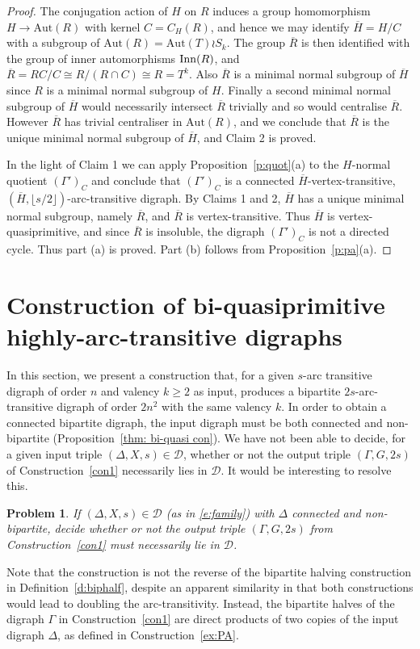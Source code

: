 \documentclass[11pt]{amsart}
\newtheorem{problem}{Problem}
\newcommand{\Aut}{\mathrm{Aut}}
\begin{document}
\begin{proof}
The conjugation action of $H$ on $R$ induces a group homomorphism $H\to \Aut(R)$ with kernel $C = C_H(R)$, and hence we may identify $\overline{H}=H/C$ with a subgroup of $\Aut(R)=\Aut(T)\wr S_k$. The group $\overline{R}$ is then identified with the group of inner automorphisms ${\rm Inn}(R)$, and $\overline{R} = RC/C\cong R/(R\cap C)\cong R= T^k$. Also $\overline{R}$ is a minimal normal subgroup of $\overline{H}$ since $R$ is a minimal normal subgroup of $H$. Finally a second minimal normal subgroup of $\overline{H}$ would necessarily intersect $\overline{R}$ trivially and so would centralise $\overline{R}$. However $\overline{R}$ has trivial centraliser in $\Aut(R)$, and we conclude that $\overline{R}$ is the unique minimal normal subgroup of $\overline{H}$, and Claim 2 is proved.
   
\smallskip
In the light of Claim 1 we can apply Proposition~\ref{p:quot}(a) to the $H$-normal quotient $(\Gamma')_{C}$ and conclude that $(\Gamma')_{C}$ is a connected $\overline{H}$-vertex-transitive, $(\overline{H},\lfloor s/2\rfloor)$-arc-transitive digraph. By Claims 1 and 2, $\overline{H}$ has a unique minimal normal subgroup, namely $\overline{R}$, and $\overline{R}$ is vertex-transitive. Thus  $\overline{H}$ is vertex-quasiprimitive, and since $\overline{R}$ is insoluble, the digraph  $(\Gamma')_{C}$ is not a directed cycle. Thus part (a) is proved. 
Part (b) follows from Proposition~\ref{p:pa}(a).
  \end{proof}


\section{Construction of bi-quasiprimitive highly-arc-transitive digraphs}\label{s:conn}

In this section, we present a construction that, for a given  $s$-arc transitive digraph of order $n$ and valency $k\geq 2$ as input, produces a bipartite $2s$-arc-transitive digraph of order $2n^2$ with the same valency $k$. In order to obtain a connected bipartite digraph, the input digraph must be both connected and non-bipartite (Proposition~\ref{thm: bi-quasi con}). We have not been able to decide, for a given input triple $(\Delta, X, s)\in\mathcal{D}$, whether or not the output  triple $(\Gamma, G, 2s)$ of Construction~\ref{con1} necessarily lies in $\mathcal{D}$. It would be interesting to resolve this. 

\begin{problem}\label{p6}
    If $(\Delta, X, s)\in\mathcal{D}$ (as in \eqref{e:family}) with $\Delta$ connected and non-bipartite, decide whether or not the output triple $(\Gamma, G, 2s)$ from Construction~\ref{con1} must necessarily lie in $\mathcal{D}$.  
\end{problem}
Note that the construction is not the reverse of the bipartite halving construction in Definition~\ref{d:biphalf}, despite an apparent similarity in that both constructions would lead to doubling the arc-transitivity. Instead, the bipartite halves of the digraph $\Gamma$ in Construction~\ref{con1} are direct products of two copies of the input digraph $\Delta$, as defined in Construction~\ref{ex:PA}. 
\end{document}
